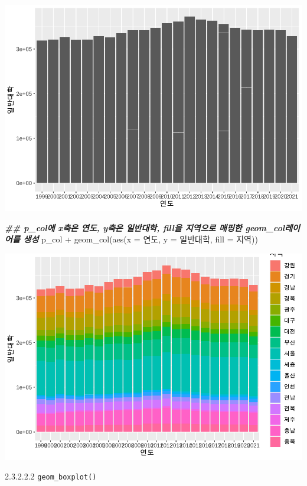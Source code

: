 \documentclass[
]{article}
\newenvironment{Shaded}{\begin{snugshade}}{\end{snugshade}}
\newcommand{\AttributeTok}[1]{\textcolor[rgb]{0.77,0.63,0.00}{#1}}
\newcommand{\DocumentationTok}[1]{\textcolor[rgb]{0.56,0.35,0.01}{\textbf{\textit{#1}}}}
\newcommand{\FunctionTok}[1]{\textcolor[rgb]{0.00,0.00,0.00}{#1}}
\newcommand{\NormalTok}[1]{#1}
\newcommand{\SpecialCharTok}[1]{\textcolor[rgb]{0.00,0.00,0.00}{#1}}
\begin{document}
\includegraphics{chap3_files/figure-latex/unnamed-chunk-36-2.pdf}

\begin{Shaded}
\begin{Highlighting}[]
\DocumentationTok{\#\#  p\_col에 x축은 연도, y축은 일반대학, fill을 지역으로 매핑한 geom\_col레이어를 생성}
\NormalTok{p\_col }\SpecialCharTok{+}
  \FunctionTok{geom\_col}\NormalTok{(}\FunctionTok{aes}\NormalTok{(}\AttributeTok{x =}\NormalTok{ 연도, }\AttributeTok{y =}\NormalTok{ 일반대학, }\AttributeTok{fill =}\NormalTok{ 지역))}
\end{Highlighting}
\end{Shaded}

\includegraphics{chap3_files/figure-latex/unnamed-chunk-36-3.pdf}

2.3.2.2.2 \texttt{geom\_boxplot()}
\end{document}
